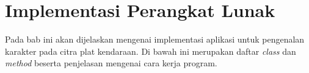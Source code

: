
\section{Implementasi Perangkat Lunak}
\noindent Pada bab ini akan dijelaskan mengenai implementasi aplikasi untuk pengenalan karakter pada citra plat kendaraan. Di bawah ini merupakan daftar \textit{class} dan \textit{method} beserta penjelasan mengenai cara kerja program.\\
